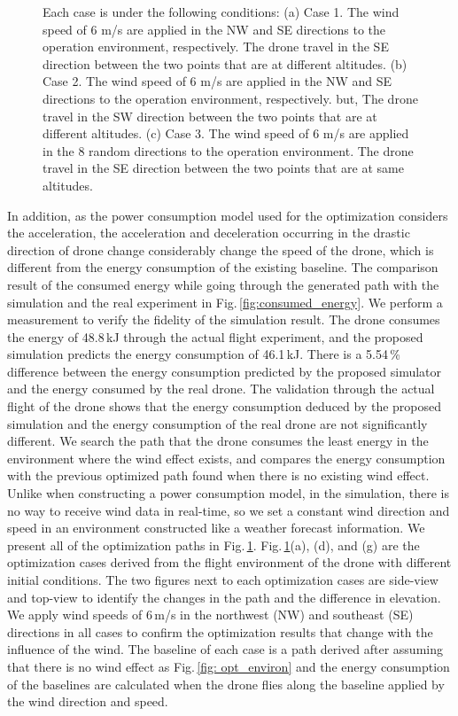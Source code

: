 \documentclass[journal]{./template/IEEEtran}
\begin{document}
\begin{figure}[htp!b]
\caption{Each case is under the following conditions: 
(a) Case 1. The wind speed of 6 m/s are applied in the NW and SE directions to the operation environment, respectively. The drone travel in the SE direction between the two points that are at different altitudes.
(b) Case 2. The wind speed of 6 m/s are applied in the NW and SE directions to the operation environment, respectively. but, The drone travel in the SW direction between the two points that are at different altitudes.
(c) Case 3. The wind speed of 6 m/s are applied in the 8 random directions to the operation environment. The drone travel in the SE direction between the two points that are at same altitudes.
}
\label{fig: wind_opt}
\end{figure}

\noindent In addition, as the power consumption model used for the optimization considers the acceleration, the acceleration and deceleration occurring in the drastic direction of drone change considerably change the speed of the drone, which is different from the energy consumption of the existing baseline.
The comparison result of the consumed energy while going through the generated path with the simulation and the real experiment in Fig.\,\ref{fig:consumed_energy}. 
We perform a measurement to verify the fidelity of the simulation result.
The drone consumes the energy of 48.8\,kJ through the actual flight experiment, and the proposed simulation predicts the energy consumption of 46.1\,kJ.
There is a 5.54\,\% difference between the energy consumption predicted by the proposed simulator and the energy consumed by the real drone.
The validation through the actual flight of the drone shows that the energy consumption deduced by the proposed simulation and the energy consumption of the real drone are not significantly different.
We search the path that the drone consumes the least energy in the environment where the wind effect exists, and compares the energy consumption with the previous optimized path found when there is no existing wind effect.
Unlike when constructing a power consumption model, in the simulation, there is no way to receive wind data in real-time, so we set a constant wind direction and speed in an environment constructed like a weather forecast information.
We present all of the optimization paths in Fig.\,\ref{fig: wind_opt}. 
Fig.\,\ref{fig: wind_opt}(a), (d), and (g) are the optimization cases derived from the flight environment of the drone with different initial conditions. 
The two figures next to each optimization cases are side-view and top-view to identify the changes in the path and the difference in elevation.  
We apply wind speeds of 6\,m/s in the northwest (NW) and southeast (SE) directions in all cases to confirm the optimization results that change with the influence of the wind.
The baseline of each case is a path derived after assuming that there is no wind effect as Fig.\,\ref{fig: opt_environ} and the energy consumption of the baselines are calculated when the drone flies along the baseline applied by the wind direction and speed.
\end{document}
